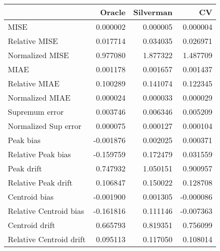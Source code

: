 \begin{tabular}{lrrr}
  \toprule
 & Oracle & Silverman & CV \\ 
  \midrule
MISE & 0.000002 & 0.000005 & 0.000004 \\ 
  Relative MISE & 0.017714 & 0.034035 & 0.026971 \\ 
  Normalized MISE & 0.977080 & 1.877322 & 1.487709 \\ 
  MIAE & 0.001178 & 0.001657 & 0.001437 \\ 
  Relative MIAE & 0.100289 & 0.141074 & 0.122345 \\ 
  Normalized MIAE & 0.000024 & 0.000033 & 0.000029 \\ 
  Supremum error & 0.003746 & 0.006346 & 0.005209 \\ 
  Normalized Sup error & 0.000075 & 0.000127 & 0.000104 \\ 
  Peak bias & -0.001876 & 0.002025 & 0.000371 \\ 
  Relative Peak bias & -0.159759 & 0.172479 & 0.031559 \\ 
  Peak drift & 0.747932 & 1.050151 & 0.900957 \\ 
  Relative Peak drift & 0.106847 & 0.150022 & 0.128708 \\ 
  Centroid bias & -0.001900 & 0.001305 & -0.000086 \\ 
  Relative Centroid bias & -0.161816 & 0.111146 & -0.007363 \\ 
  Centroid drift & 0.665793 & 0.819351 & 0.756099 \\ 
  Relative Centroid drift & 0.095113 & 0.117050 & 0.108014 \\ 
   \bottomrule
\end{tabular}
